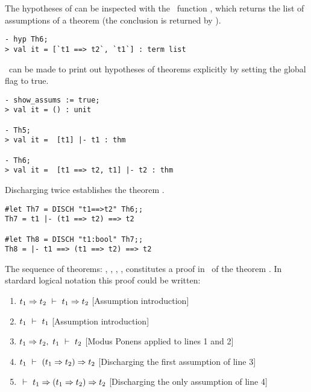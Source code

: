     The hypotheses of  can be inspected with the \ML\ function
    , which returns the list of assumptions of a theorem (the
    conclusion is returned by ).

\begin{session}\begin{verbatim}
- hyp Th6;
> val it = [`t1 ==> t2`, `t1`] : term list
\end{verbatim}\end{session}

    \HOL\ can be made to print out hypotheses of theorems explicitly
    by setting the global flag  to true.

\begin{session}\begin{verbatim}
- show_assums := true;
> val it = () : unit

- Th5;
> val it =  [t1] |- t1 : thm

- Th6;
> val it =  [t1 ==> t2, t1] |- t2 : thm
\end{verbatim}\end{session}


\noindent Discharging  twice establishes the theorem
.

\begin{session}\begin{verbatim}
#let Th7 = DISCH "t1==>t2" Th6;;
Th7 = t1 |- (t1 ==> t2) ==> t2

#let Th8 = DISCH "t1:bool" Th7;;
Th8 = |- t1 ==> (t1 ==> t2) ==> t2
\end{verbatim}\end{session}

The sequence of theorems: ,
, , ,  constitutes a proof in \HOL\ of
the theorem . In stardard logical notation this
proof could be written:

\begin{enumerate}
\item $ t_1\Rightarrow t_2\ \vdash\  t_1\Rightarrow t_2$ \hfill
[Assumption introduction]
\item $ t_1\ \vdash\  t_1$ \hfill
[Assumption introduction]
\item $t_1\Rightarrow t_2,\ t_1 \ \vdash\  t_2 $ \hfill
[Modus Ponens applied to lines 1 and 2]
\item $t_1 \ \vdash\  (t_1\Rightarrow t_2)\Rightarrow t_2$ \hfill
[Discharging the first assumption of line 3]
\item $\ \vdash\  t_1 \Rightarrow (t_1 \Rightarrow t_2) \Rightarrow t_2$ \hfill
[Discharging the only assumption of line 4]
\end{enumerate}


